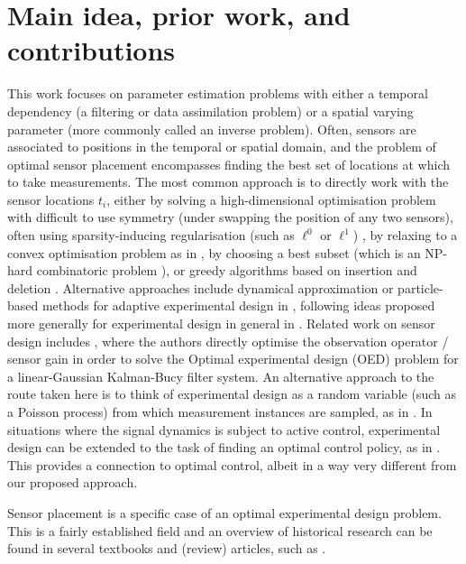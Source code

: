 \documentclass[10pt]{article}
\numberwithin{equation}{section}
\numberwithin{figure}{section}
\theoremstyle{remark}
\begin{document}
\section{Main idea, prior work, and contributions}
This work focuses on parameter estimation problems with either a temporal dependency (a filtering or data assimilation problem) or a spatial varying parameter (more commonly called an inverse problem). Often, sensors are associated to positions in the temporal or spatial domain, and the problem of optimal sensor placement encompasses finding the best set of locations at which to take measurements. The most common approach is to directly work with the sensor locations $t_i$, 
either by solving a high-dimensional optimisation problem with difficult to use symmetry (under swapping the position of any two sensors), often using sparsity-inducing regularisation (such as $\ell^0$ or $\ell^1$) \cite{alexanderian2014optimal,haber2008numerical,haber2012numerical,ucinski2020d,das2020optimal}, by relaxing to a convex optimisation problem as in \cite{maity2022sensor}, by choosing a best subset (which is an NP-hard combinatoric problem \cite{ye2018complexity}), or greedy algorithms based on insertion and deletion \cite{aarset2024global,de2024ensemble,mula2025dynamical}. Alternative approaches include dynamical approximation \cite{mula2025dynamical} or particle-based methods for adaptive experimental design in \cite{iqbal2024nesting}, following ideas proposed more generally for experimental design in general in \cite{amzal2006bayesian}. 
Related work on sensor design includes \cite{zinage2022optimal}, where the authors directly optimise the observation operator / sensor gain in order to solve the Optimal experimental design (OED) problem for a linear-Gaussian Kalman-Bucy filter system. An alternative approach to the route taken here is to think of experimental design as a random variable (such as a Poisson process) from which measurement instances are sampled, as in \cite{xiong2023bias}. In situations where the signal dynamics is subject to active control, experimental design can be extended to the task of finding an optimal control policy, as in \cite{hooker2015control}. This provides a connection to optimal control, albeit in a way very different from our proposed approach.
 
Sensor placement is a specific case of an optimal experimental design problem. This is a fairly established field and an overview of historical research can be found in several textbooks and (review) articles, such as \cite{ucinski2004optimal,muller2004optimal,muller2005simulation,pukelsheim2006optimal,atkinson2007optimum,huan2014gradient,alexanderian2021optimal,huan2024optimal}. 
\end{document}
